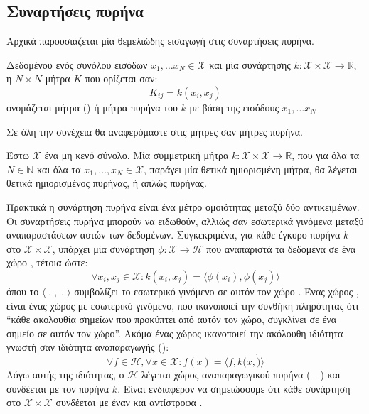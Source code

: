 \subsection{Συναρτήσεις πυρήνα}
Αρχικά παρουσιάζεται μία θεμελιώδης εισαγωγή στις συναρτήσεις πυρήνα.
\begin{definition}
Δεδομένου ενός συνόλου εισόδων $x_{1}, \dots x_{N} \in \mathcal{X}$ και μία συνάρτησης $k:\mathcal{X}\times\mathcal{X}\rightarrow \mathbb{R}$, η $N \times N$ μήτρα $K$ που ορίζεται σαν:
$$K_{ij} = k(x_{i}, x_{j}) $$
ονομάζεται  μήτρα () ή μήτρα πυρήνα του $k$ με βάση της εισόδους $x_{1}, \dots x_{N}$
\label{def:kernel_matrix}
\end{definition}
Σε όλη την συνέχεια θα αναφερόμαστε στις μήτρες  σαν μήτρες πυρήνα.
\begin{definition}
Έστω $\mathcal{X}$ ένα μη κενό σύνολο.
Μία συμμετρική μήτρα $k:\mathcal{X} \times \mathcal{X} \rightarrow \mathbb{R}$, που για όλα τα $N \in \mathbb{N}$ και όλα τα $x_{1},\dots, x_{N} \in \mathcal{X}$, παράγει μία θετικά ημιορισμένη μήτρα, θα λέγεται θετικά ημιορισμένος πυρήνας, ή απλώς πυρήνας.
\label{def:psd_km}
\end{definition}
Πρακτικά η συνάρτηση πυρήνα είναι ένα μέτρο ομοιότητας μεταξύ δύο αντικειμένων.
Οι συναρτήσεις πυρήνα μπορούν να ειδωθούν, αλλιώς σαν εσωτερικά γινόμενα μεταξύ αναπαραστάσεων αυτών των δεδομένων.
Συγκεκριμένα, για κάθε έγκυρο πυρήνα $k$ στο $\mathcal{X}\times\mathcal{X}$, υπάρχει μία συνάρτηση $\phi: \mathcal{X} \rightarrow \mathcal{H}$ που αναπαριστά τα δεδομένα σε ένα χώρο , τέτοια ώστε:
\begin{equation}
\forall x_{i}, x_{j} \in \mathcal{X}: k(x_{i}, x_{j}) = \langle \phi(x_{i}), \phi(x_{j}) \rangle
\end{equation}
όπου το $\langle\;.\;,\;.\;\rangle$ συμβολίζει το εσωτερικό γινόμενο σε αυτόν τον χώρο .
Ένας χώρος , είναι ένας χώρος με εσωτερικό γινόμενο, που ικανοποιεί την συνθήκη πληρότητας ότι ``κάθε ακολουθία σημείων  που προκύπτει από αυτόν τον χώρο, συγκλίνει σε ένα σημείο σε αυτόν τον χώρο''. Ακόμα ένας χώρος  ικανοποιεί την ακόλουθη ιδιότητα γνωστή σαν ιδιότητα αναπαραγωγής ():
\begin{equation}
\forall f \in \mathcal{H}, \forall x \in \mathcal{X}: f(x)=\langle f, k(x,\dot)\rangle
\end{equation}
Λόγω αυτής της ιδιότητας, ο $\mathcal{H}$ λέγεται χώρος  αναπαραγωγικού πυρήνα ( - ) και συνδέεται με τον πυρήνα $k$.
Είναι ενδιαφέρον να σημειώσουμε ότι κάθε συνάρτηση στο $\mathcal{X} \times \mathcal{X}$ συνδέεται με έναν  και αντίστροφα \cite{Aronszajn1950}.

